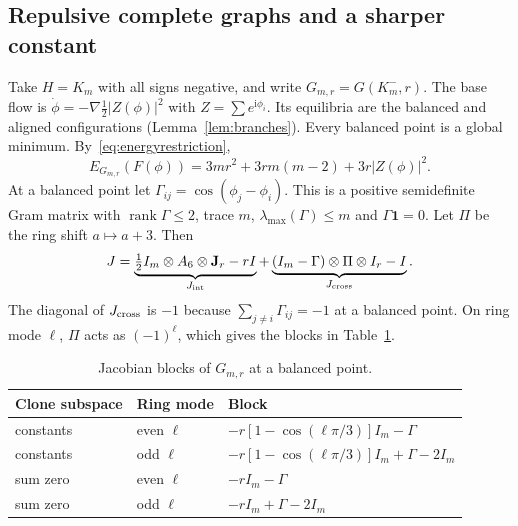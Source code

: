 \documentclass[11pt,a4paper]{article}
\theoremstyle{definition}\newtheorem{conjecture}{Conjecture}
\theoremstyle{remark}\newtheorem{remark}[theorem]{Remark}
\newcommand{\ii}{\mathrm{i}}
\DeclareMathOperator{\rank}{rank}
\begin{document}
\subsection{Repulsive complete graphs and a sharper constant}
Take $H=K_m$ with all signs negative, and write $G_{m,r}=G(K_m^-,r)$. The base flow is $\dot\phi=-\nabla\tfrac12|Z(\phi)|^2$ with $Z=\sum e^{\ii\phi_i}$. Its equilibria are the balanced and aligned configurations (Lemma~\ref{lem:branches}). Every balanced point is a global minimum. By~\eqref{eq:energyrestriction},
\begin{equation}\label{eq:specialenergy}
 E_{G_{m,r}}(F(\phi))=3mr^2+3rm(m-2)+3r|Z(\phi)|^2 .
\end{equation}
At a balanced point let $\Gamma_{ij}=\cos(\phi_j-\phi_i)$. This is a positive semidefinite Gram matrix with $\rank\Gamma\le2$, trace $m$, $\lambda_{\max}(\Gamma)\le m$ and $\Gamma\mathbf1=0$. Let $\Pi$ be the ring shift $a\mapsto a+3$. Then
\begin{equation}\label{eq:specialJ}
 J=\underbrace{\tfrac12 I_m\otimes A_6\otimes\mathbf J_r-rI}_{J_{\rm int}}+\underbrace{(I_m-\Gamma)\otimes\Pi\otimes I_r-I}_{J_{\rm cross}} .
\end{equation}
The diagonal of $J_{\rm cross}$ is $-1$ because $\sum_{j\ne i}\Gamma_{ij}=-1$ at a balanced point. On ring mode $\ell$, $\Pi$ acts as $(-1)^\ell$, which gives the blocks in Table~\ref{tab:blocks}.

\begin{table}[h]\centering\small
\caption{Jacobian blocks of $G_{m,r}$ at a balanced point.}\label{tab:blocks}
\begin{tabular}{lll}\toprule
Clone subspace & Ring mode & Block\\\midrule
constants & even $\ell$ & $-r[1-\cos(\ell\pi/3)]I_m-\Gamma$\\
constants & odd $\ell$ & $-r[1-\cos(\ell\pi/3)]I_m+\Gamma-2I_m$\\
sum zero & even $\ell$ & $-rI_m-\Gamma$\\
sum zero & odd $\ell$ & $-rI_m+\Gamma-2I_m$\\\bottomrule
\end{tabular}
\end{table}
\end{document}
